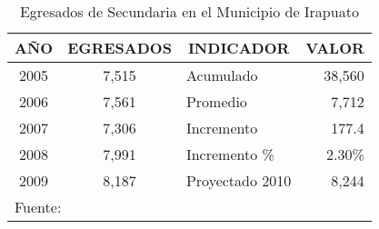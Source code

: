 \begin{table}
    \centering
    \caption{Egresados de Secundaria en el Municipio de Irapuato}
    \label{tbl:SEG:Secundaria}
    \begin{tabular}{c|c||l|r}
        AÑO & EGRESADOS & \multicolumn{1}{c|}{INDICADOR}
            & \multicolumn{1}{c}{VALOR} \\
        \hline \hline
        2005 & 7,515 & Acumulado       & 38,560  \\
        2006 & 7,561 & Promedio        &  7,712  \\
        2007 & 7,306 & Incremento      &  177.4  \\
        2008 & 7,991 & Incremento \%   &  2.30\% \\
        2009 & 8,187 & Proyectado 2010 &  8,244  \\
        \hline
        \multicolumn{4}{l}{\footnotesize Fuente: \citep{Seg2010}}
    \end{tabular}
\end{table}
